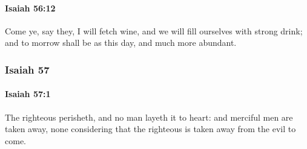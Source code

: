 		\paragraph{Isaiah 56:12} %
			\label{ISAIAH-56-12}

			Come ye, say they, I will fetch wine, and we will fill ourselves with strong drink; and to morrow shall be as this day, and much more abundant.

	\subsubsection{Isaiah 57} %
		\label{ISAIAH-57}

		\paragraph{Isaiah 57:1} %
			\label{ISAIAH-57-1}

			The righteous perisheth, and no man layeth it to heart: and merciful men are taken away, none considering that the righteous is taken away from the evil to come.

